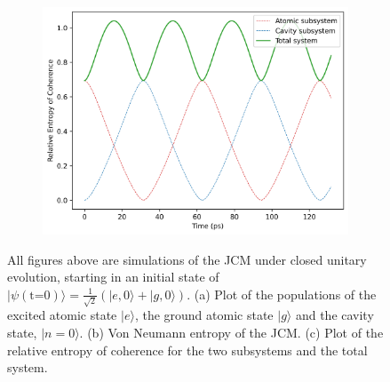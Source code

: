 \documentclass[11pt]{article}
\begin{document}
\begin{figure}[h]
    \begin{subfigure}{0.45\textwidth}
        \centering
        \includegraphics[width=\linewidth]{Research Project/Code/results/JCM/CQS_coh_eg.png}
        \caption{}
        \label{fig:jcm_cqs_coh_eg}
    \end{subfigure}
    \hfill

    \caption{All figures above are simulations of the JCM under closed unitary evolution, starting in an initial state of $|\psi (\text{t=0})\rangle = \frac{1}{\sqrt{2}}(|e, 0\rangle + |g,0\rangle)$. (a) Plot of the populations of the excited atomic state $|e\rangle$, the ground atomic state $|g\rangle$ and the cavity state, $|n=0\rangle$. (b) Von Neumann entropy of the JCM. (c) Plot of the relative entropy of coherence for the two subsystems and the total system.}
    \label{fig:JCM_cqs_e0g0}
\end{figure}
\end{document}
